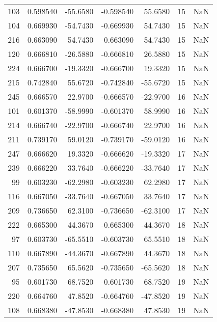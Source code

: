 \begin{tabular}{rrrrrrr}
103 &    0.598540 &  -55.6580 &   -0.598540 &     55.6580 &          15 & NaN \\
104 &    0.669930 &  -54.7430 &   -0.669930 &     54.7430 &          15 & NaN \\
216 &    0.663090 &   54.7430 &   -0.663090 &    -54.7430 &          15 & NaN \\
120 &    0.666810 &  -26.5880 &   -0.666810 &     26.5880 &          15 & NaN \\
224 &    0.666700 &  -19.3320 &   -0.666700 &     19.3320 &          15 & NaN \\
215 &    0.742840 &   55.6720 &   -0.742840 &    -55.6720 &          15 & NaN \\
245 &    0.666570 &   22.9700 &   -0.666570 &    -22.9700 &          16 & NaN \\
101 &    0.601370 &  -58.9990 &   -0.601370 &     58.9990 &          16 & NaN \\
214 &    0.666740 &  -22.9700 &   -0.666740 &     22.9700 &          16 & NaN \\
211 &    0.739170 &   59.0120 &   -0.739170 &    -59.0120 &          16 & NaN \\
247 &    0.666620 &   19.3320 &   -0.666620 &    -19.3320 &          17 & NaN \\
239 &    0.666220 &   33.7640 &   -0.666220 &    -33.7640 &          17 & NaN \\
 99 &    0.603230 &  -62.2980 &   -0.603230 &     62.2980 &          17 & NaN \\
116 &    0.667050 &  -33.7640 &   -0.667050 &     33.7640 &          17 & NaN \\
209 &    0.736650 &   62.3100 &   -0.736650 &    -62.3100 &          17 & NaN \\
222 &    0.665300 &   44.3670 &   -0.665300 &    -44.3670 &          18 & NaN \\
 97 &    0.603730 &  -65.5510 &   -0.603730 &     65.5510 &          18 & NaN \\
110 &    0.667890 &  -44.3670 &   -0.667890 &     44.3670 &          18 & NaN \\
207 &    0.735650 &   65.5620 &   -0.735650 &    -65.5620 &          18 & NaN \\
 95 &    0.601730 &  -68.7520 &   -0.601730 &     68.7520 &          19 & NaN \\
220 &    0.664760 &   47.8520 &   -0.664760 &    -47.8520 &          19 & NaN \\
108 &    0.668380 &  -47.8530 &   -0.668380 &     47.8530 &          19 & NaN \\

\end{tabular}
